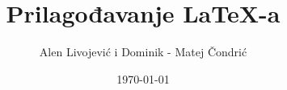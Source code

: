 \documentclass{beamer}
\title{Prilagođavanje LaTeX-a}
\author{Alen Livojević i Dominik - Matej Čondrić}
\institute{Tehnički fakultet Rijeka}
\date{\today}
\begin{document}
\begin{frame}
\titlepage
\end{frame}
\end{document}

